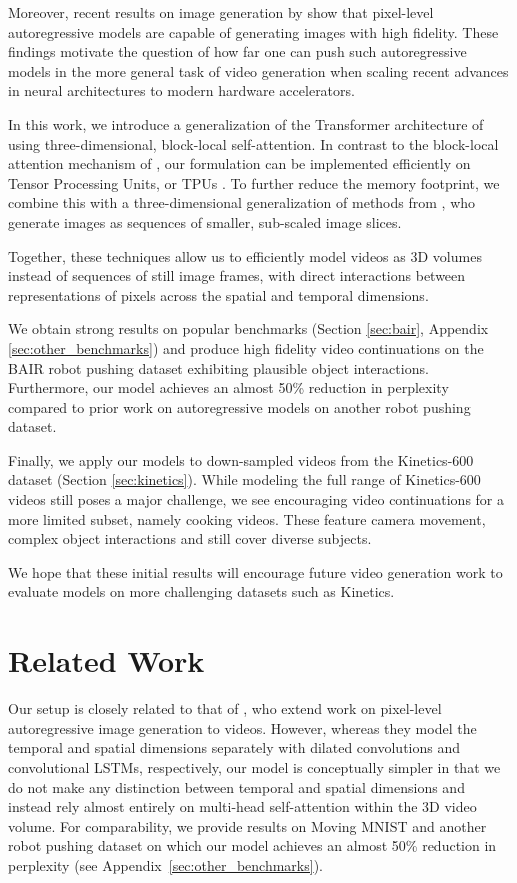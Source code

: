 \documentclass{article} \usepackage{iclr2020_conference,times}
\begin{document}
Moreover, recent results on image generation by \citet{Menick2018GeneratingHF} show that pixel-level autoregressive models are capable of generating images with high fidelity. These findings motivate the question of how far one can push such autoregressive models in the more general task of video generation when scaling recent advances in neural architectures to modern hardware accelerators.

In this work, we introduce a generalization of the Transformer architecture of \citet{Vaswani2017AttentionIA} using three-dimensional, block-local self-attention. In contrast to the block-local attention mechanism of \citet{Parmar2018ImageT}, our formulation can be implemented efficiently on Tensor Processing Units, or TPUs \citep{Jouppi2017TPU}.
To further reduce the memory footprint, we combine this with a three-dimensional generalization of methods from \citet{Menick2018GeneratingHF}, who generate images as sequences of smaller, sub-scaled image slices.

Together, these techniques allow us to efficiently model videos as 3D volumes instead of sequences of still image frames, with direct interactions between representations of pixels across the spatial and temporal dimensions.

We obtain strong results on popular benchmarks (Section \ref{sec:bair}, Appendix \ref{sec:other_benchmarks}) and produce high fidelity video continuations on the BAIR robot pushing dataset \citep{ebert17sna} exhibiting plausible object interactions. Furthermore, our model achieves an almost 50\% reduction in perplexity compared to prior work on autoregressive models on another robot pushing dataset.

Finally, we apply our models to down-sampled videos from the Kinetics-600 dataset \citep{Carreira2018ASN} (Section \ref{sec:kinetics}). While modeling the full range of Kinetics-600 videos still poses a major challenge, we see encouraging video continuations for a more limited subset, namely cooking videos. These feature camera movement, complex object interactions and still cover diverse subjects.


We hope that these initial results will encourage future video generation work to evaluate models on more challenging datasets such as Kinetics.

\section{Related Work}
Our setup is closely related to that of \citet{Kalchbrenner2016VideoPN}, who extend work on pixel-level autoregressive image generation \citep{Oord2016PixelRNN,Oord2016PixelCNN} to videos. However, whereas they model the temporal and spatial dimensions separately with dilated convolutions and convolutional LSTMs, respectively, our model is conceptually simpler in that we do not make any distinction between temporal and spatial dimensions and instead rely almost entirely on multi-head self-attention \citep{Vaswani2017AttentionIA} within the 3D video volume. For comparability, we provide results on Moving MNIST and another robot pushing dataset \citep{Finn2016RobotPushing} on which our model achieves an almost 50\% reduction in perplexity (see Appendix~\ref{sec:other_benchmarks}).
\end{document}
